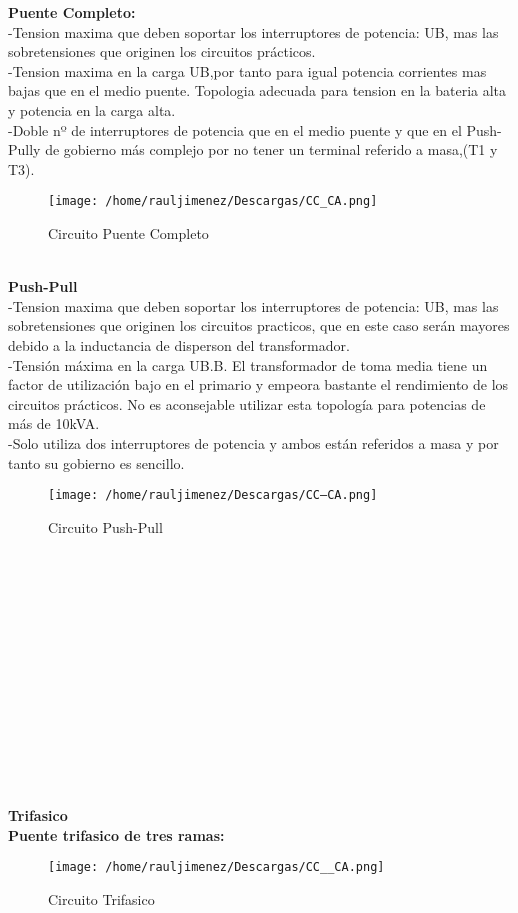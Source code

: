 \documentclass[11pt]{article}
\begin{document}
\textbf{Puente Completo:}\\
-Tension maxima que deben soportar los interruptores de potencia: UB, mas las sobretensiones que originen los circuitos prácticos.\\
-Tension maxima en la carga UB,por tanto para igual potencia corrientes mas bajas  que en el medio puente. Topologia adecuada para tension en la bateria alta y potencia en la carga alta.\\
-Doble nº de interruptores de potencia que en el medio puente y que en el Push-Pully de gobierno más complejo por no tener un terminal referido a masa,(T1 y T3).\\
\begin{figure}[htp]
\centering
\texttt{[image: /home/rauljimenez/Descargas/CC\_CA.png]}
\caption{Circuito Puente Completo}
\label{}
\end{figure}\\

\textbf{Push-Pull}\\
-Tension maxima que deben soportar los interruptores de potencia: UB, mas las sobretensiones que originen los circuitos practicos, que en este caso serán mayores debido a la inductancia de disperson del transformador.\\
-Tensión máxima en la carga UB.B. El transformador de toma media tiene un factor de utilización bajo en el primario y empeora bastante el rendimiento de los circuitos prácticos. No es aconsejable utilizar esta topología para potencias de más de 10kVA.\\
-Solo utiliza dos interruptores de potencia y ambos están referidos a masa y por tanto su gobierno es sencillo.\\
\begin{figure}[htp]
\centering
\texttt{[image: /home/rauljimenez/Descargas/CC--CA.png]}
\caption{Circuito Push-Pull}
\label{}
\end{figure}\\
\\\\\\\\\\\\\\\\\\\\\\\\
\textbf{Trifasico}\\
\textbf{Puente trifasico de tres ramas:}\\
\begin{figure}[htp]
\centering
\texttt{[image: /home/rauljimenez/Descargas/CC\_\_CA.png]}
\caption{Circuito Trifasico}
\label{}
\end{figure}\\\\
\end{document}
